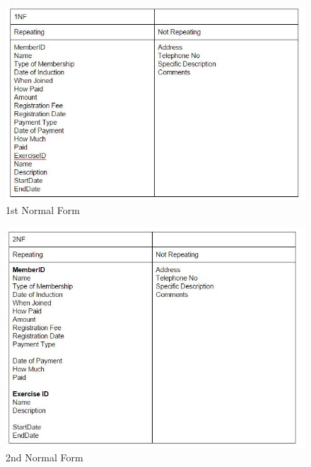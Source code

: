 \begin{itemize}
\begin{figure}[H]
    \includegraphics[width=\textwidth]{Norm2.JPG}
    \caption{1st Normal Form} \label{fig: 1st Normal Form}
\end{figure}

\begin{figure}[H]
    \includegraphics[width=\textwidth]{Norm3.JPG}
    \caption{2nd Normal Form} \label{fig: 2nd Normal Form}
\end{figure}


\end{itemize}
